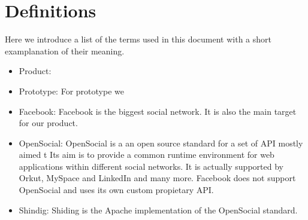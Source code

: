 \section{Definitions}

Here we introduce a list of the terms used in this document with a short examplanation of their meaning.

\begin{itemize}
\item{Product}:
\item{Prototype}: For prototype we 
\item{Facebook}: Facebook is the biggest social network. It is also the main target for our product.
\item{OpenSocial}: OpenSocial is a an open source standard for a set of API mostly aimed t
Its aim is to provide a common runtime environment for web applications within different social networks.
It is actually supported by Orkut, MySpace and LinkedIn and many more. Facebook does not support
OpenSocial and uses its own custom propietary API.
\item{Shindig}: Shiding is the Apache implementation of the OpenSocial standard.
\end{itemize}